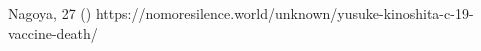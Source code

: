           {
            Nagoya, 
          }
          {
            27
          }
          {
          }
          {
          }
          {
             ()
          }
          {https://nomoresilence.world/unknown/yusuke-kinoshita-c-19-vaccine-death/}
